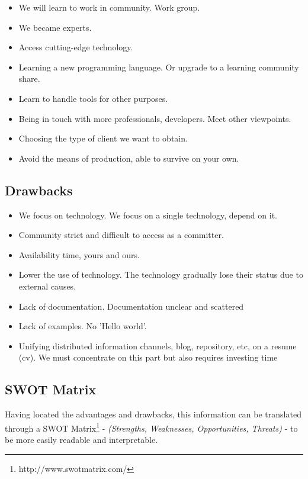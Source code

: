 \documentclass[11pt]{scrartcl}
\begin{document}
\begin{itemize}
    \item We will learn to work in community. Work group.
    \item We became experts.
    \item Access cutting-edge technology.
    \item Learning a new programming language. Or upgrade to a learning community share.
    \item Learn to handle tools for other purposes.
    \item Being in touch with more professionals, developers. Meet other viewpoints.
    \item Choosing the type of client we want to obtain.
    \item Avoid the means of production, able to survive on your own.
\end{itemize}

\subsection{Drawbacks}

\begin{itemize}
    \item We focus on technology. We focus on a single technology, depend on it.
    \item Community strict and difficult to access as a committer.
    \item Availability time, yours and ours. 
    \item Lower the use of technology. The technology gradually lose their status due to external causes.
    \item Lack of documentation. Documentation unclear and scattered
    \item Lack of examples. No 'Hello world'.
    \item Unifying distributed information channels, blog, repository, etc, on a resume (cv). We must concentrate on this part but also requires investing time
\end{itemize}

\subsection{SWOT Matrix}

\par Having located the advantages and drawbacks, this information can be translated through a SWOT Matrix\footnote{http://www.swotmatrix.com/} - \emph{(Strengths, Weaknesses, Opportunities, Threats)} - to be more easily readable and interpretable.
\end{document}
